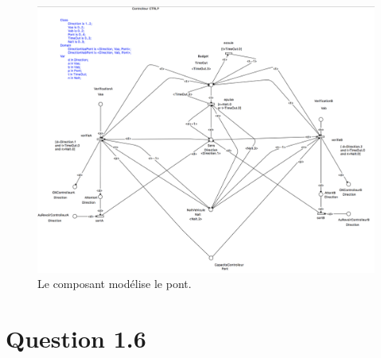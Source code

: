 \documentclass[a4paper,11pt]{report}
\begin{document}
	\begin{figure}[!htbp]
		\includegraphics[width = 18cm]{ctrlpModel.png}
		\caption{Le composant modélise le pont.}
	\end{figure}
	\newpage
	
\section{Question 1.6}
	
\end{document}
